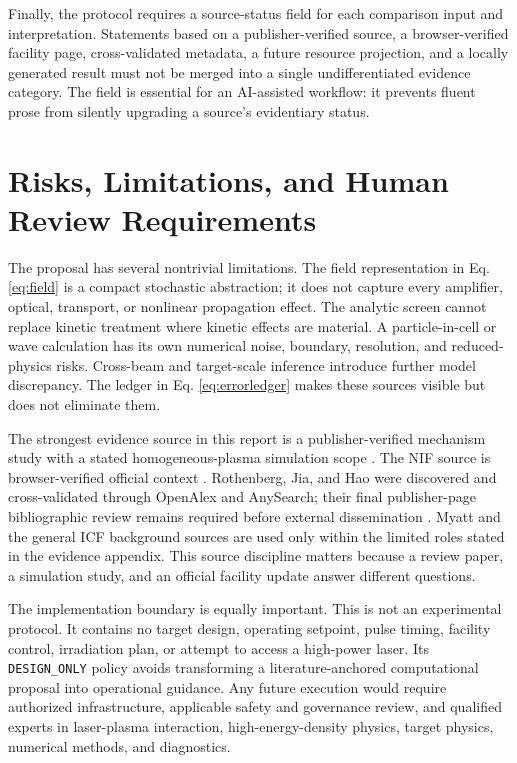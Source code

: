 \documentclass[conference]{../../../../Conference-LaTeX-template_10-17-19/IEEEtran}
\begin{document}
Finally, the protocol requires a source-status field for each comparison input and interpretation. Statements based on a publisher-verified source, a browser-verified facility page, cross-validated metadata, a future resource projection, and a locally generated result must not be merged into a single undifferentiated evidence category. The field is essential for an AI-assisted workflow: it prevents fluent prose from silently upgrading a source's evidentiary status.

\section{Risks, Limitations, and Human Review Requirements}
The proposal has several nontrivial limitations. The field representation in Eq. \eqref{eq:field} is a compact stochastic abstraction; it does not capture every amplifier, optical, transport, or nonlinear propagation effect. The analytic screen cannot replace kinetic treatment where kinetic effects are material. A particle-in-cell or wave calculation has its own numerical noise, boundary, resolution, and reduced-physics risks. Cross-beam and target-scale inference introduce further model discrepancy. The ledger in Eq. \eqref{eq:errorledger} makes these sources visible but does not eliminate them.

The strongest evidence source in this report is a publisher-verified mechanism study with a stated homogeneous-plasma simulation scope \cite{ma2021}. The NIF source is browser-verified official context \cite{nif_2026}. Rothenberg, Jia, and Hao were discovered and cross-validated through OpenAlex and AnySearch; their final publisher-page bibliographic review remains required before external dissemination \cite{rothenberg2000,jia2023,hao2023}. Myatt and the general ICF background sources are used only within the limited roles stated in the evidence appendix. This source discipline matters because a review paper, a simulation study, and an official facility update answer different questions.

The implementation boundary is equally important. This is not an experimental protocol. It contains no target design, operating setpoint, pulse timing, facility control, irradiation plan, or attempt to access a high-power laser. Its \texttt{DESIGN\_ONLY} policy avoids transforming a literature-anchored computational proposal into operational guidance. Any future execution would require authorized infrastructure, applicable safety and governance review, and qualified experts in laser-plasma interaction, high-energy-density physics, target physics, numerical methods, and diagnostics.
\end{document}
